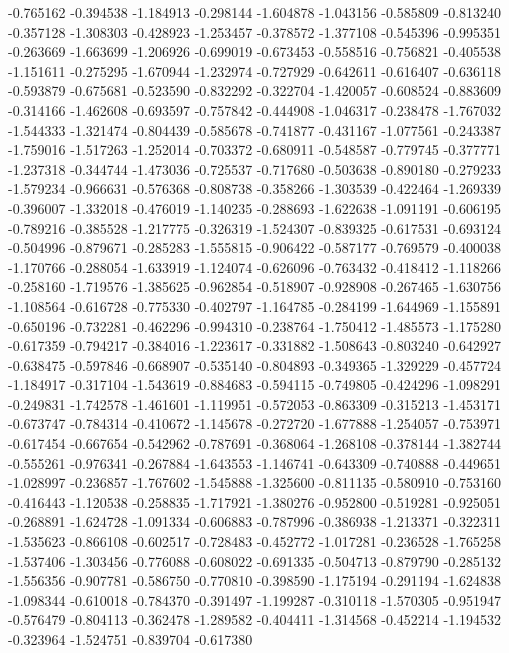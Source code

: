 -0.765162
-0.394538
-1.184913
-0.298144
-1.604878
-1.043156
-0.585809
-0.813240
-0.357128
-1.308303
-0.428923
-1.253457
-0.378572
-1.377108
-0.545396
-0.995351
-0.263669
-1.663699
-1.206926
-0.699019
-0.673453
-0.558516
-0.756821
-0.405538
-1.151611
-0.275295
-1.670944
-1.232974
-0.727929
-0.642611
-0.616407
-0.636118
-0.593879
-0.675681
-0.523590
-0.832292
-0.322704
-1.420057
-0.608524
-0.883609
-0.314166
-1.462608
-0.693597
-0.757842
-0.444908
-1.046317
-0.238478
-1.767032
-1.544333
-1.321474
-0.804439
-0.585678
-0.741877
-0.431167
-1.077561
-0.243387
-1.759016
-1.517263
-1.252014
-0.703372
-0.680911
-0.548587
-0.779745
-0.377771
-1.237318
-0.344744
-1.473036
-0.725537
-0.717680
-0.503638
-0.890180
-0.279233
-1.579234
-0.966631
-0.576368
-0.808738
-0.358266
-1.303539
-0.422464
-1.269339
-0.396007
-1.332018
-0.476019
-1.140235
-0.288693
-1.622638
-1.091191
-0.606195
-0.789216
-0.385528
-1.217775
-0.326319
-1.524307
-0.839325
-0.617531
-0.693124
-0.504996
-0.879671
-0.285283
-1.555815
-0.906422
-0.587177
-0.769579
-0.400038
-1.170766
-0.288054
-1.633919
-1.124074
-0.626096
-0.763432
-0.418412
-1.118266
-0.258160
-1.719576
-1.385625
-0.962854
-0.518907
-0.928908
-0.267465
-1.630756
-1.108564
-0.616728
-0.775330
-0.402797
-1.164785
-0.284199
-1.644969
-1.155891
-0.650196
-0.732281
-0.462296
-0.994310
-0.238764
-1.750412
-1.485573
-1.175280
-0.617359
-0.794217
-0.384016
-1.223617
-0.331882
-1.508643
-0.803240
-0.642927
-0.638475
-0.597846
-0.668907
-0.535140
-0.804893
-0.349365
-1.329229
-0.457724
-1.184917
-0.317104
-1.543619
-0.884683
-0.594115
-0.749805
-0.424296
-1.098291
-0.249831
-1.742578
-1.461601
-1.119951
-0.572053
-0.863309
-0.315213
-1.453171
-0.673747
-0.784314
-0.410672
-1.145678
-0.272720
-1.677888
-1.254057
-0.753971
-0.617454
-0.667654
-0.542962
-0.787691
-0.368064
-1.268108
-0.378144
-1.382744
-0.555261
-0.976341
-0.267884
-1.643553
-1.146741
-0.643309
-0.740888
-0.449651
-1.028997
-0.236857
-1.767602
-1.545888
-1.325600
-0.811135
-0.580910
-0.753160
-0.416443
-1.120538
-0.258835
-1.717921
-1.380276
-0.952800
-0.519281
-0.925051
-0.268891
-1.624728
-1.091334
-0.606883
-0.787996
-0.386938
-1.213371
-0.322311
-1.535623
-0.866108
-0.602517
-0.728483
-0.452772
-1.017281
-0.236528
-1.765258
-1.537406
-1.303456
-0.776088
-0.608022
-0.691335
-0.504713
-0.879790
-0.285132
-1.556356
-0.907781
-0.586750
-0.770810
-0.398590
-1.175194
-0.291194
-1.624838
-1.098344
-0.610018
-0.784370
-0.391497
-1.199287
-0.310118
-1.570305
-0.951947
-0.576479
-0.804113
-0.362478
-1.289582
-0.404411
-1.314568
-0.452214
-1.194532
-0.323964
-1.524751
-0.839704
-0.617380
